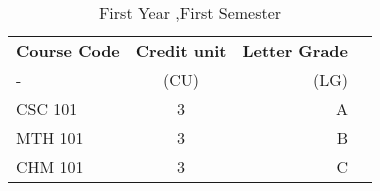 \documentclass{article}
\begin{document}
	
\begin{table}[h!]
	\begin{center}
 \caption{First Year ,First Semester }
 \label{tab:table1}
 \begin{tabular}{l|c|r|c}
 	\textbf{Course Code} & \textbf{Credit unit} & 
 	\textbf{Letter Grade}\\
 	- & (CU) & (LG)\\
	\hline
 	CSC 101 & 3 & A\\
 	MTH 101 & 3 & B\\
 	CHM 101 & 3 & C\\
   \end{tabular}
  \end{center}
\end{table}
\end{document}
